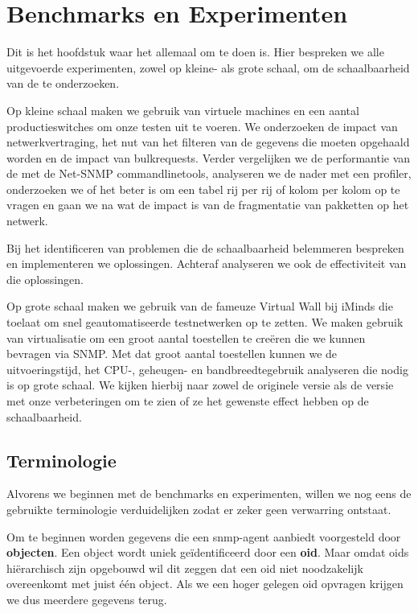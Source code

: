 \chapter{Benchmarks en Experimenten}

Dit is het hoofdstuk waar het allemaal om te doen is.
Hier bespreken we alle uitgevoerde experimenten, zowel op kleine- als grote schaal, om de schaalbaarheid van de \nwmretriever{} te onderzoeken.

Op kleine schaal maken we gebruik van virtuele machines en een aantal productieswitches om onze testen uit te voeren.
We onderzoeken de impact van netwerkvertraging, het nut van het filteren van de gegevens die moeten opgehaald worden en de impact van bulkrequests.
Verder vergelijken we de performantie van de \nwmretriever{} met de Net-SNMP commandlinetools,
analyseren we de \nwmretriever{} nader met een profiler, onderzoeken we of het beter is om een tabel rij per rij of kolom per kolom op te vragen
en gaan we na wat de impact is van de fragmentatie van pakketten op het netwerk.

Bij het identificeren van problemen die de schaalbaarheid belemmeren bespreken en implementeren we oplossingen.
Achteraf analyseren we ook de effectiviteit van die oplossingen.

Op grote schaal maken we gebruik van de fameuze Virtual Wall bij iMinds die toelaat om snel geautomatiseerde testnetwerken op te zetten.
We maken gebruik van virtualisatie om een groot aantal toestellen te creëren die we kunnen bevragen via SNMP.
Met dat groot aantal toestellen kunnen we de uitvoeringstijd, het CPU-, geheugen- en bandbreedtegebruik analyseren die nodig is op grote schaal.
We kijken hierbij naar zowel de originele versie als de versie met onze verbeteringen om te zien of ze het gewenste effect hebben op de schaalbaarheid.


\section{Terminologie}

Alvorens we beginnen met de benchmarks en experimenten, willen we nog eens de gebruikte terminologie verduidelijken zodat er zeker geen verwarring ontstaat.

Om te beginnen worden gegevens die een \gls{snmp-agent} aanbiedt voorgesteld door \textbf{objecten}.
Een object wordt uniek geïdentificeerd door een \textbf{\gls{oid}}.
Maar omdat \glspl{oid} hiërarchisch zijn opgebouwd wil dit zeggen dat een \gls{oid} niet noodzakelijk overeenkomt met juist één object.
Als we een hoger gelegen \gls{oid} opvragen krijgen we dus meerdere gegevens terug.

